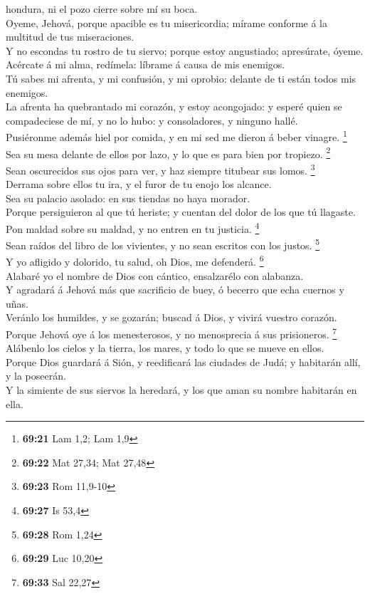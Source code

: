 hondura, ni el pozo cierre sobre mí su boca.\\
 Oyeme, Jehová, porque apacible es tu misericordia;
mírame conforme á la multitud de tus miseraciones.\\
 Y no escondas tu rostro de tu siervo; porque estoy
angustiado; apresúrate, óyeme.\\
 Acércate á mi alma, redímela: líbrame á causa de mis
enemigos.\\
 Tú sabes mi afrenta, y mi confusión, y mi oprobio:
delante de ti están todos mis enemigos.\\
 La afrenta ha quebrantado mi corazón, y estoy
acongojado: y esperé quien se compadeciese de mí, y no lo hubo: y
consoladores, y ninguno hallé.\\
 Pusiéronme además hiel por comida, y en mi sed me dieron
á beber vinagre. \footnote{\textbf{69:21} Lam 1,2; Lam 1,9}\\
 Sea su mesa delante de ellos por lazo, y lo que es para
bien por tropiezo. \footnote{\textbf{69:22} Mat 27,34; Mat 27,48}\\
 Sean oscurecidos sus ojos para ver, y haz siempre
titubear sus lomos. \footnote{\textbf{69:23} Rom 11,9-10}\\
 Derrama sobre ellos tu ira, y el furor de tu enojo los
alcance.\\
 Sea su palacio asolado: en sus tiendas no haya
morador.\\
 Porque persiguieron al que tú heriste; y cuentan del
dolor de los que tú llagaste.\\
 Pon maldad sobre su maldad, y no entren en tu justicia.
\footnote{\textbf{69:27} Is 53,4}\\
 Sean raídos del libro de los vivientes, y no sean
escritos con los justos. \footnote{\textbf{69:28} Rom 1,24}\\
 Y yo afligido y dolorido, tu salud, oh Dios, me
defenderá. \footnote{\textbf{69:29} Luc 10,20}\\
 Alabaré yo el nombre de Dios con cántico, ensalzarélo
con alabanza.\\
 Y agradará á Jehová más que sacrificio de buey, ó
becerro que echa cuernos y uñas.\\
 Veránlo los humildes, y se gozarán; buscad á Dios, y
vivirá vuestro corazón.\\
 Porque Jehová oye á los menesterosos, y no menosprecia á
sus prisioneros. \footnote{\textbf{69:33} Sal 22,27}\\
 Alábenlo los cielos y la tierra, los mares, y todo lo
que se mueve en ellos.\\
 Porque Dios guardará á Sión, y reedificará las ciudades
de Judá; y habitarán allí, y la poseerán.\\
 Y la simiente de sus siervos la heredará, y los que aman
su nombre habitarán en ella.

